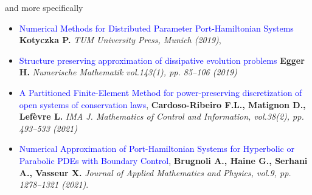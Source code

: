 \documentclass[10pt,aspectratio=43]{ISAE-Beamer}
\newcommand{\blue}[1]{\textcolor{blue}{#1}}
\begin{document}
\begin{frame}{and more specifically}
	\begin{itemize}
		\item \blue{Numerical Methods for Distributed Parameter Port-Hamiltonian Systems}
		\textbf{\quad Kotyczka P.}
		\quad  \textit{TUM University Press, Munich (2019)},
		\item \blue{Structure preserving approximation of dissipative evolution problems}
		\textbf{\quad  Egger H.}
		\quad  \textit{Numerische Mathematik vol.143(1), pp. 85--106 (2019)}
		\item \blue{A Partitioned Finite-Element Method for power-preserving discretization of open systems of conservation laws},
		\textbf{\quad Cardoso-Ribeiro F.L., Matignon D., Lef\`evre L.}
		\quad  \textit{IMA J. Mathematics of Control and Information, vol.38(2), pp. 493--533 (2021)}
		\item \blue{Numerical Approximation of Port-Hamiltonian
			Systems for Hyperbolic or Parabolic PDEs with
			Boundary Control},
		\textbf{\quad Brugnoli A., Haine G., Serhani A., Vasseur X.}
		\quad  \textit{Journal of Applied Mathematics and Physics, vol.9,  pp. 1278--1321 (2021)}.
	\end{itemize}
	
\end{frame}
\end{document}
